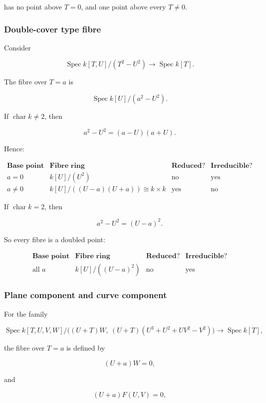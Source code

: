 \documentclass[12pt,a4paper]{article}
\theoremstyle{notespace}
\begin{document}
has no point above \(T=0\), and one point above every \(T\neq 0\).

\subsubsection{Double-cover type fibre}

Consider

\[
\operatorname{Spec}k[T,U]/(T^2-U^2)
\to
\operatorname{Spec}k[T].
\]

The fibre over \(T=a\) is

\[
\operatorname{Spec}k[U]/(a^2-U^2).
\]

If \(\operatorname{char}k\neq 2\), then

\[
a^2-U^2=(a-U)(a+U).
\]

Hence:

\[
\begin{array}{c|c|c|c}
	\textbf{Base point} & \textbf{Fibre ring} & \textbf{Reduced?} & \textbf{Irreducible?} \\
	\hline
	a=0
	&
	k[U]/(U^2)
	&
	\text{no}
	&
	\text{yes}
	\\
	\hline
	a\neq 0
	&
	k[U]/((U-a)(U+a))\cong k\times k
	&
	\text{yes}
	&
	\text{no}
\end{array}
\]

If \(\operatorname{char}k=2\), then

\[
a^2-U^2=(U-a)^2.
\]

So every fibre is a doubled point:

\[
\begin{array}{c|c|c|c}
	\textbf{Base point} & \textbf{Fibre ring} & \textbf{Reduced?} & \textbf{Irreducible?} \\
	\hline
	\text{all }a
	&
	k[U]/((U-a)^2)
	&
	\text{no}
	&
	\text{yes}
\end{array}
\]

\subsubsection{Plane component and curve component}

For the family

\[
\operatorname{Spec}
k[T,U,V,W]/
\bigl((U+T)W,\ (U+T)(U^3+U^2+UV^2-V^2)\bigr)
\to
\operatorname{Spec}k[T],
\]

the fibre over \(T=a\) is defined by

\[
(U+a)W=0,
\]

and

\[
(U+a)F(U,V)=0,
\]
\end{document}
